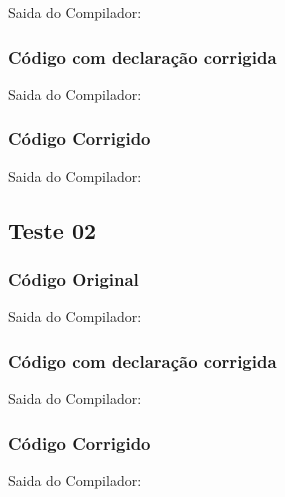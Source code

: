 Saida do Compilador:



\subsubsection{Código com declaração corrigida}


Saida do Compilador:



\subsubsection{Código Corrigido}


Saida do Compilador:



\subsection{Teste 02}
\label{subsec:semanticoTeste02}

\subsubsection{Código Original}


Saida do Compilador:





\subsubsection{Código com declaração corrigida}


Saida do Compilador:




\subsubsection{Código Corrigido}


Saida do Compilador:




